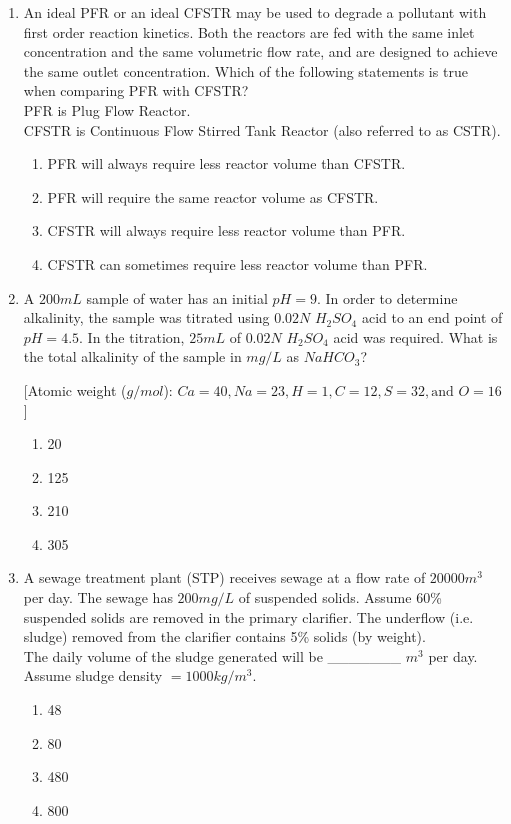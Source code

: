 \documentclass[journal]{IEEEtran}
\begin{document}
\begin{enumerate}[start=1]
\item An ideal PFR or an ideal CFSTR may be used to degrade a pollutant with first order reaction kinetics. Both the reactors are fed with the same inlet concentration and the same volumetric flow rate, and are designed to achieve the same outlet concentration. Which of the following statements is true when comparing PFR with CFSTR?\\

PFR is Plug Flow Reactor.\\

CFSTR is Continuous Flow Stirred Tank Reactor (also referred to as CSTR). \hfill{}
\begin{enumerate}
    \item PFR will always require less reactor volume than CFSTR.
    \item PFR will require the same reactor volume as CFSTR.
    \item CFSTR will always require less reactor volume than PFR.
    \item CFSTR can sometimes require less reactor volume than PFR.
\end{enumerate}

\item A $200 mL$ sample of water has an initial $pH = 9$. In order to determine alkalinity, the sample was titrated using $0.02 N$ $H_2SO_4$ acid to an end point of $pH = 4.5$. In the titration, $25 mL$ of $0.02 N$  $H_2SO_4$ acid was required. What is the total alkalinity of the sample in $mg/L$ as $NaHCO_3$?

[Atomic weight ($g/mol$): $Ca = 40, Na = 23, H = 1, C = 12, S = 32, \text{and } O = 16$]
\hfill{}
\begin{enumerate}
    \item 20
    \item 125
    \item 210
    \item 305
\end{enumerate}

\item A sewage treatment plant (STP) receives sewage at a flow rate of $20000 m^3$ per day. The sewage has $200 mg/L$ of suspended solids. Assume 60\% suspended solids are removed in the primary clarifier. The underflow (i.e. sludge) removed from the clarifier contains 5\% solids (by weight).\\
The daily volume of the sludge generated will be
\_\_\_\_\_\_\_ $m^3$ per day.\\
Assume sludge density $= 1000 kg/m^3$. \hfill{}
\begin{enumerate}
    \item 48
    \item 80
    \item 480
    \item 800
\end{enumerate}


\end{enumerate}
\end{document}
